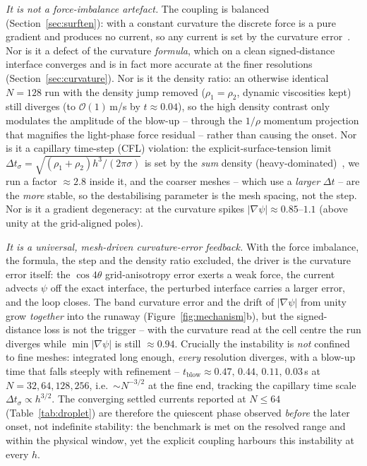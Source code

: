 \documentclass[preprint,3p,11pt]{elsarticle}
\newcommand{\psilev}{\psi}                       %
\begin{document}
\emph{It is not a force-imbalance artefact.} The coupling is balanced (Section~\ref{sec:surften}):
with a constant curvature the discrete force is a pure gradient and produces no current, so any
current is set by the curvature error~\cite{francois2006,popinet2018}. Nor is it a defect of the
curvature \emph{formula}, which on a clean signed-distance interface converges and is in fact more
accurate at the finer resolutions (Section~\ref{sec:curvature}). Nor is it the density ratio: an
otherwise identical $N=128$ run with the density jump removed ($\rho_1=\rho_2$, dynamic viscosities
kept) still diverges (to $\mathcal{O}(1)$\,m/s by $t\approx0.04$), so the high density contrast only
modulates the amplitude of the blow-up -- through the $1/\rho$ momentum projection that magnifies the
light-phase force residual -- rather than causing the onset. Nor is it a capillary time-step (CFL)
violation: the explicit-surface-tension limit $\Delta t_\sigma=\sqrt{(\rho_1+\rho_2)h^3/(2\pi\sigma)}$
is set by the \emph{sum} density (heavy-dominated)~\cite{brackbill1992}, we run a factor $\approx2.8$
inside it, and the coarser meshes -- which use a \emph{larger} $\Delta t$ -- are the \emph{more}
stable, so the destabilising parameter is the mesh spacing, not the step. Nor is it a gradient
degeneracy: at the curvature spikes $\lvert\nabla\psilev\rvert\approx0.85$--$1.1$ (above unity at the
grid-aligned poles).

\emph{It is a universal, mesh-driven curvature-error feedback.} With the force imbalance, the
formula, the step and the density ratio excluded, the driver is the curvature error itself: the
$\cos4\theta$ grid-anisotropy error exerts a weak force, the current advects $\psilev$ off the exact
interface, the perturbed interface carries a larger error, and the loop closes. The band curvature
error and the drift of $\lvert\nabla\psilev\rvert$ from unity grow \emph{together} into the runaway
(Figure~\ref{fig:mechanism}b), but the signed-distance loss is not the trigger -- with the curvature
read at the cell centre the run diverges while $\min\lvert\nabla\psilev\rvert$ is still $\approx0.94$.
Crucially the instability is \emph{not} confined to fine meshes: integrated long enough, \emph{every}
resolution diverges, with a blow-up time that falls steeply with refinement --
$t_{\mathrm{blow}}\approx0.47,\,0.44,\,0.11,\,0.03$\,s at $N=32,64,128,256$, i.e.\ $\sim N^{-3/2}$ at
the fine end, tracking the capillary time scale $\Delta t_\sigma\propto h^{3/2}$. The converging
settled currents reported at $N\le64$ (Table~\ref{tab:droplet}) are therefore the quiescent phase
observed \emph{before} the later onset, not indefinite stability: the benchmark is met on the resolved
range and within the physical window, yet the explicit coupling harbours this instability at every $h$.
\end{document}
